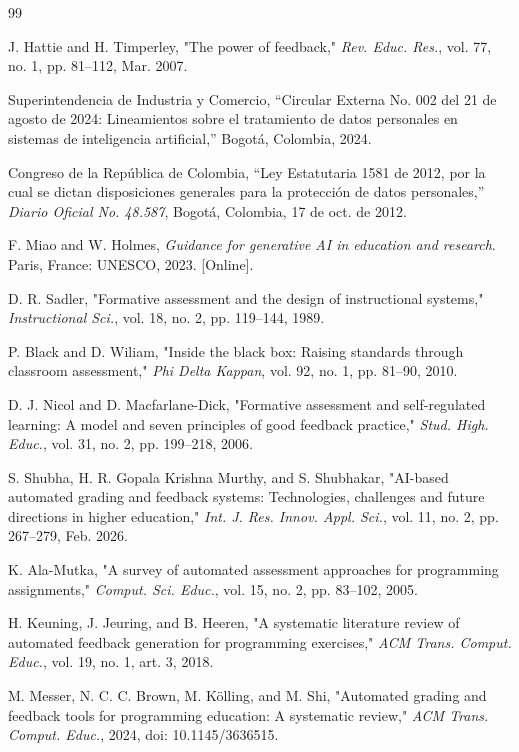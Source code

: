 \documentclass[letterpaper, 10 pt, conference]{ieeeconf}
\begin{document}
\begin{thebibliography}{99}

 J. Hattie and H. Timperley, "The power of feedback," \textit{Rev. Educ. Res.}, vol. 77, no. 1, pp. 81–112, Mar. 2007.

 Superintendencia de Industria y Comercio, “Circular Externa No. 002 del 21 de agosto de 2024: Lineamientos sobre el tratamiento de datos personales en sistemas de inteligencia artificial,” Bogotá, Colombia, 2024.

 Congreso de la República de Colombia, “Ley Estatutaria 1581 de 2012, por la cual se dictan disposiciones generales para la protección de datos personales,” \textit{Diario Oficial No. 48.587}, Bogotá, Colombia, 17 de oct. de 2012.

 F. Miao and W. Holmes, \textit{Guidance for generative AI in education and research}. Paris, France: UNESCO, 2023. [Online].

 D. R. Sadler, "Formative assessment and the design of instructional systems," \textit{Instructional Sci.}, vol. 18, no. 2, pp. 119–144, 1989.

 P. Black and D. Wiliam, "Inside the black box: Raising standards through classroom assessment," \textit{Phi Delta Kappan}, vol. 92, no. 1, pp. 81–90, 2010.

 D. J. Nicol and D. Macfarlane-Dick, "Formative assessment and self-regulated learning: A model and seven principles of good feedback practice," \textit{Stud. High. Educ.}, vol. 31, no. 2, pp. 199–218, 2006.

 S. Shubha, H. R. Gopala Krishna Murthy, and S. Shubhakar, "AI-based automated grading and feedback systems: Technologies, challenges and future directions in higher education," \textit{Int. J. Res. Innov. Appl. Sci.}, vol. 11, no. 2, pp. 267–279, Feb. 2026.

 K. Ala-Mutka, "A survey of automated assessment approaches for programming assignments," \textit{Comput. Sci. Educ.}, vol. 15, no. 2, pp. 83–102, 2005.

 H. Keuning, J. Jeuring, and B. Heeren, "A systematic literature review of automated feedback generation for programming exercises," \textit{ACM Trans. Comput. Educ.}, vol. 19, no. 1, art. 3, 2018.

 M. Messer, N. C. C. Brown, M. Kölling, and M. Shi, "Automated grading and feedback tools for programming education: A systematic review," \textit{ACM Trans. Comput. Educ.}, 2024, doi: 10.1145/3636515.


\end{thebibliography}
\end{document}
